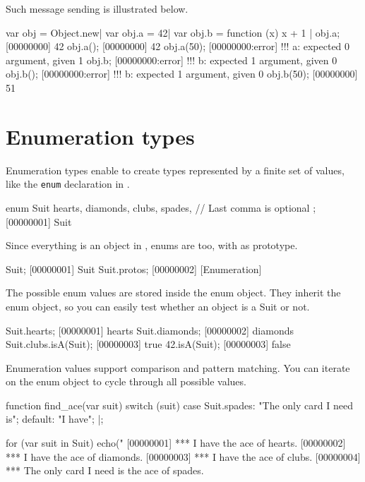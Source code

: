 Such message sending is illustrated below.

\begin{urbiscript}
var obj = Object.new|
var obj.a = 42|
var obj.b = function (x) { x + 1 }|
obj.a;
[00000000] 42
obj.a();
[00000000] 42
obj.a(50);
[00000000:error] !!! a: expected 0 argument, given 1
obj.b;
[00000000:error] !!! b: expected 1 argument, given 0
obj.b();
[00000000:error] !!! b: expected 1 argument, given 0
obj.b(50);
[00000000] 51
\end{urbiscript}

\section{Enumeration types}
\label{sec:lang:enum}

Enumeration types enable to create types represented by a finite set of
values, like the \lstinline{enum} declaration in \langC.

\begin{urbiscript}
enum Suit
{
  hearts,
  diamonds,
  clubs,
  spades, // Last comma is optional
};
[00000001] Suit
\end{urbiscript}

Since everything is an object in \us, enums are too, with
 as prototype.

\begin{urbiscript}
Suit;
[00000001] Suit
Suit.protos;
[00000002] [Enumeration]
\end{urbiscript}

The possible enum values are stored inside the enum object. They inherit the
enum object, so you can easily test whether an object is a Suit or not.

\begin{urbiscript}
Suit.hearts;
[00000001] hearts
Suit.diamonds;
[00000002] diamonds
Suit.clubs.isA(Suit);
[00000003] true
42.isA(Suit);
[00000003] false
\end{urbiscript}

Enumeration values support comparison and pattern matching. You can iterate
on the enum object to cycle through all possible values.

\begin{urbiscript}
function find_ace(var suit)
{
  switch (suit)
  {
    case Suit.spades: "The only card I need is";
    default:          "I have";
  }
}|;

for (var suit in Suit)
  echo("%
[00000001] *** I have the ace of hearts.
[00000002] *** I have the ace of diamonds.
[00000003] *** I have the ace of clubs.
[00000004] *** The only card I need is the ace of spades.
\end{urbiscript}

